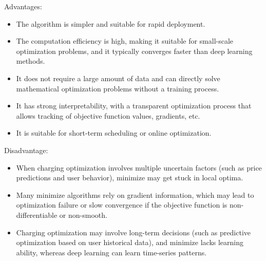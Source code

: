 \documentclass[
	english,
	ruledheaders=section,%
	class=report,%
	thesis={type=Report},%
	accentcolor=9c,%
	custommargins=true,%
	marginpar=false,%
	parskip=half-,%
	fontsize=11pt,%
	logofile={img/tuda_logo.pdf}, %
]{tudapub}
\begin{document}
Advantages:
\begin{itemize}
    
    \item The algorithm is simpler and suitable for rapid deployment. 
    \item The computation efficiency is high, making it suitable for small-scale optimization problems, and it typically converges faster than deep learning methods. 
    \item It does not require a large amount of data and can directly solve mathematical optimization problems without a training process. 
    \item It has strong interpretability, with a transparent optimization process that allows tracking of objective function values, gradients, etc. 
    \item It is suitable for short-term scheduling or online optimization. 
\end{itemize}
Disadvantage:
\begin{itemize}
    \item When charging optimization involves multiple uncertain factors (such as price predictions and user behavior), minimize may get stuck in local optima. 
    \item Many minimize algorithms rely on gradient information, which may lead to optimization failure or slow convergence if the objective function is non-differentiable or non-smooth. 
    \item Charging optimization may involve long-term decisions (such as predictive optimization based on user historical data), and minimize lacks learning ability, whereas deep learning can learn time-series patterns. 
\end{itemize}
\end{document}

